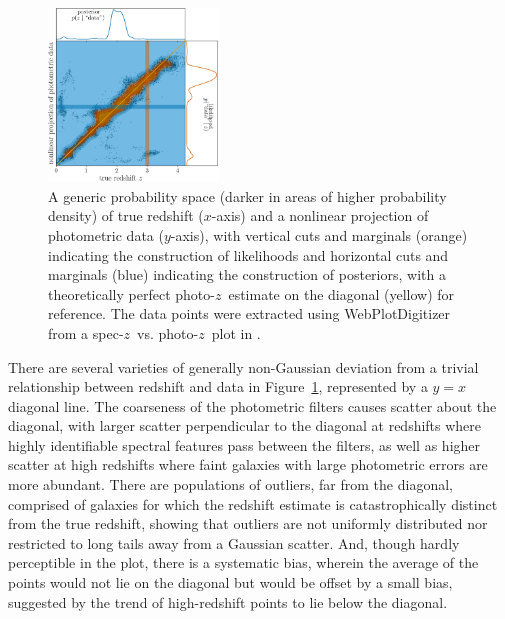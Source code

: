 \documentclass[iop]{emulateapj}
\newcommand{\todo}[3]{{\color{#2}\emph{#1}: #3}}
\newcommand{\aim}[1]{\todo{AIM}{red}{#1}}
\newcommand{\sz}{spec-$z$}
\newcommand{\pz}{photo-$z$}
\begin{document}
\begin{figure}
	\begin{center}
		\includegraphics[width=0.4\textwidth]{jain15.png}
		\caption{
			A generic probability space (darker in areas of higher probability density) of true redshift ($x$-axis) and a nonlinear projection of photometric data ($y$-axis), with vertical cuts and marginals (orange) indicating the construction of likelihoods and horizontal cuts and marginals (blue) indicating the construction of posteriors, with a theoretically perfect \pz\ estimate on the diagonal (yellow) for reference.
			The data points were extracted using WebPlotDigitizer \citep{rohatgi_webplotdigitizer_2019} from a \sz\ vs. \pz\ plot in \citet{jain_whole_2015}.
		}
		\label{fig:pedagogical_scatter}
	\end{center}
\end{figure}

There are several varieties of generally non-Gaussian deviation from a trivial relationship between redshift and data in Figure~\ref{fig:pedagogical_scatter}, represented by a $y = x$ diagonal line.
The coarseness of the photometric filters causes scatter about the diagonal, with larger scatter perpendicular to the diagonal at redshifts where highly identifiable spectral features pass between the filters, as well as higher scatter at high redshifts where faint galaxies with large photometric errors are more abundant.
There are populations of outliers, far from the diagonal, comprised of galaxies for which the redshift estimate is catastrophically distinct from the true redshift, showing that outliers are not uniformly distributed nor restricted to long tails away from a Gaussian scatter.
And, though hardly perceptible in the plot, there is a systematic bias, wherein the average of the points would not lie on the diagonal but would be offset by a small bias, suggested by the trend of high-redshift points to lie below the diagonal.
\end{document}

